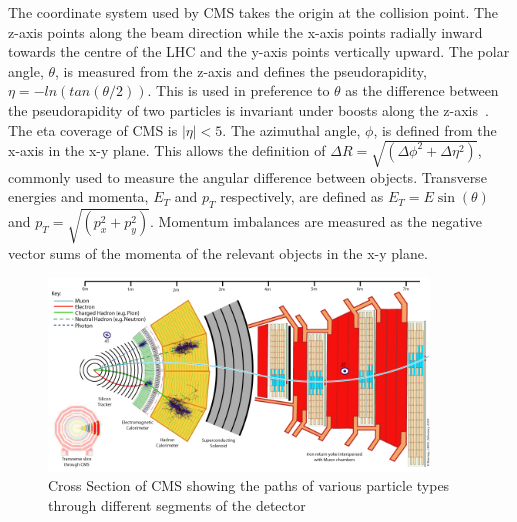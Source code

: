 The coordinate system used by CMS takes the origin at 
the collision point. The z-axis points along the beam direction while the x-axis points radially inward
towards the centre of the LHC and the y-axis points vertically upward.
The polar angle, $\theta$, is measured from the z-axis and defines the pseudorapidity, $\eta=-ln(tan(\theta/2))$. 
This is used in preference to $\theta$ as the difference between the pseudorapidity of two 
particles is invariant under boosts along the z-axis~\cite{cms_iop}. 
The eta coverage of CMS is $|\eta|<5$. The azimuthal angle, $\phi$, is defined from the x-axis in the x-y plane.
This allows the definition of $\Delta R = \sqrt{(\Delta\phi^2+\Delta\eta^2)}$, commonly used to measure the 
angular difference between objects. Transverse energies and momenta, $E_T $ and $p_T$ respectively, are defined 
as $E_T = E\sin(\theta)$ and $p_T = \sqrt{(p_{x}^2+p_{y}^2)}$. Momentum imbalances are measured as the negative 
vector sums of the momenta of the relevant objects in the x-y plane. 

\begin{figure}
\centering
    \includegraphics[width=0.9\textwidth]{./Figures/detector/CMS_Slice.jpg}
  \caption{Cross Section of CMS showing the paths of various particle types 
  through different segments of the detector~\cite{cmsslice}}
  \label{CMS_SLICE}
\end{figure}

